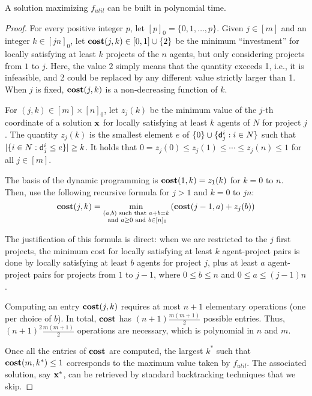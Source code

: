 \documentclass{article}
\begin{document}
\begin{theorem} A solution maximizing  $f_{util}$ can be built in polynomial time.  
\end{theorem}
\begin{proof}
For every positive integer $p$, let  $[p]_0=\{0,1, \ldots,p\}$.  
Given $j \in [m]$ and an integer $k \in [jn]_0$, let $\textbf{cost}(j,k) \in [0,1] \cup \{2\}$ be the minimum ``investment'' for locally satisfying at least $k$ projects of the $n$ agents, but only considering projects from $1$ to $j$. Here, the value $2$ simply means that the 
quantity  
exceeds 1, i.e., it is infeasible, and 2 could be replaced by any different value strictly larger than 1. When $j$ is fixed, $\textbf{cost}(j,k)$ is a non-decreasing function of $k$. 

For $(j,k) \in [m] \times [n]_0$, let $z_j(k)$ be the minimum value of the $j$-th coordinate of a solution ${\bf x}$ for locally satisfying at least $k$ agents of $N$ for project $j$. The quantity $z_j(k)$ is the 
smallest element $e$ of $\{0\} \cup \{{\sf d}_j^i : i \in N\}$ such that $|\{i \in N : {\sf d}^i_j \le e\}|\ge k$. It holds that  $0=z_j(0)\le z_j(1) \le \cdots \le z_j(n) \le 1$ for all $j \in [m]$. 

The basis of the dynamic programming is $\textbf{cost}(1,k)=z_1(k)$ for $k=0$ to $n$. Then, use the following recursive formula for $j>1$ and $k=0$ to $jn$: 
\begin{equation*}
\textbf{cost}(j,k)=\min_{\substack{(a,b) \text{ such that } a+b=k\\ \text{ and } a \ge 0 \text{ and } b\in [n]_0}} \left( \textbf{cost}(j-1,a)+z_j(b) \right)
\end{equation*}


The justification of this formula is direct: when we are restricted to the $j$ first projects, 
the minimum cost for 
 locally satisfying at least $k$ agent-project pairs is done by locally satisfying at least $b$ agents for project $j$, plus at least $a$ agent-project pairs for projects from $1$ to $j-1$, where $0 \le b \le n$ and $0 \le a \le (j-1)n$.     

Computing an entry $\textbf{cost}(j,k)$ requires at most $n+1$ elementary operations (one per choice of $b$). In total, $\textbf{cost}$ has $(n+1)\frac{m(m+1)}{2}$ possible entries. Thus,  $(n+1)^2\frac{m(m+1)}{2}$ operations are necessary, which is polynomial in $n$ and $m$. 


Once all the entries of $\textbf{cost}$ are computed, the largest $k^*$ such that $\textbf{cost}(m,k^*) \le 1$ corresponds to the maximum value taken by $f_{util}$. The associated solution, say ${\bf x}^*$, can be retrieved by standard backtracking techniques that we skip. 
\end{proof}
\end{document}

